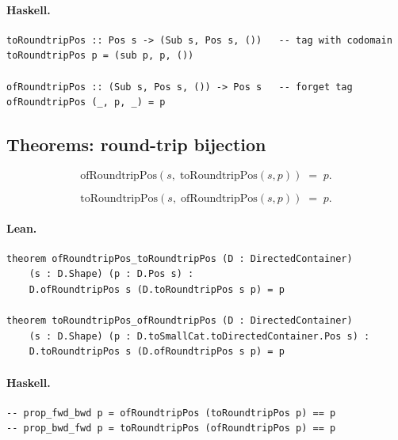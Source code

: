 \documentclass[11pt,a4paper]{article}
\begin{document}
\paragraph{Haskell.}
\begin{lstlisting}[style=haskell]
toRoundtripPos :: Pos s -> (Sub s, Pos s, ())   -- tag with codomain
toRoundtripPos p = (sub p, p, ())

ofRoundtripPos :: (Sub s, Pos s, ()) -> Pos s   -- forget tag
ofRoundtripPos (_, p, _) = p
\end{lstlisting}


\subsection{Theorems: round-trip bijection}

\begin{thm}
\[
  \mathrm{ofRoundtripPos}(s,\; \mathrm{toRoundtripPos}(s, p)) \;=\; p.
\]
\end{thm}

\begin{thm}
\[
  \mathrm{toRoundtripPos}(s,\; \mathrm{ofRoundtripPos}(s, p)) \;=\; p.
\]
\end{thm}

\paragraph{Lean.}
\begin{lstlisting}[style=lean]
theorem ofRoundtripPos_toRoundtripPos (D : DirectedContainer)
    (s : D.Shape) (p : D.Pos s) :
    D.ofRoundtripPos s (D.toRoundtripPos s p) = p

theorem toRoundtripPos_ofRoundtripPos (D : DirectedContainer)
    (s : D.Shape) (p : D.toSmallCat.toDirectedContainer.Pos s) :
    D.toRoundtripPos s (D.ofRoundtripPos s p) = p
\end{lstlisting}

\paragraph{Haskell.}
\begin{lstlisting}[style=haskell]
-- prop_fwd_bwd p = ofRoundtripPos (toRoundtripPos p) == p
-- prop_bwd_fwd p = toRoundtripPos (ofRoundtripPos p) == p
\end{lstlisting}


\end{document}
